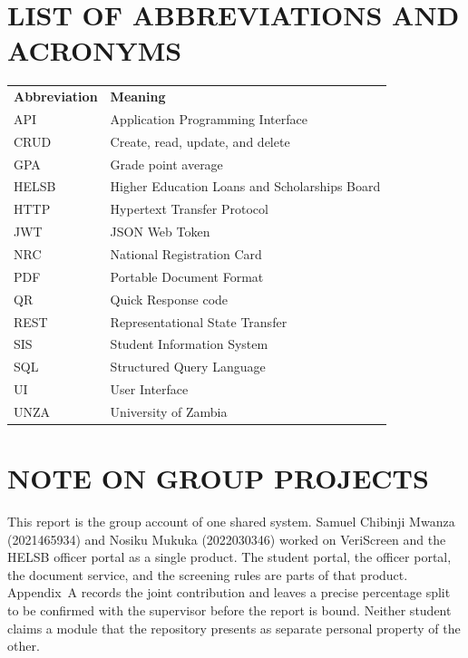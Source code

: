 \documentclass[12pt,a4paper]{report}
\begin{document}
\clearpage

\tableofcontents
\clearpage

\listoffigures
\clearpage

\listoftables
\clearpage

\chapter*{LIST OF ABBREVIATIONS AND ACRONYMS}

\begin{longtable}{p{}p{}}
\textbf{Abbreviation} & \textbf{Meaning}\\
API & Application Programming Interface\\
CRUD & Create, read, update, and delete\\
GPA & Grade point average\\
HELSB & Higher Education Loans and Scholarships Board\\
HTTP & Hypertext Transfer Protocol\\
JWT & JSON Web Token\\
NRC & National Registration Card\\
PDF & Portable Document Format\\
QR & Quick Response code\\
REST & Representational State Transfer\\
SIS & Student Information System\\
SQL & Structured Query Language\\
UI & User Interface\\
UNZA & University of Zambia\\
\end{longtable}

\clearpage

\chapter*{NOTE ON GROUP PROJECTS}

This report is the group account of one shared system. Samuel Chibinji Mwanza (2021465934) and Nosiku Mukuka (2022030346) worked on VeriScreen and the HELSB officer portal as a single product. The student portal, the officer portal, the document service, and the screening rules are parts of that product. Appendix~A records the joint contribution and leaves a precise percentage split to be confirmed with the supervisor before the report is bound. Neither student claims a module that the repository presents as separate personal property of the other.
\end{document}
